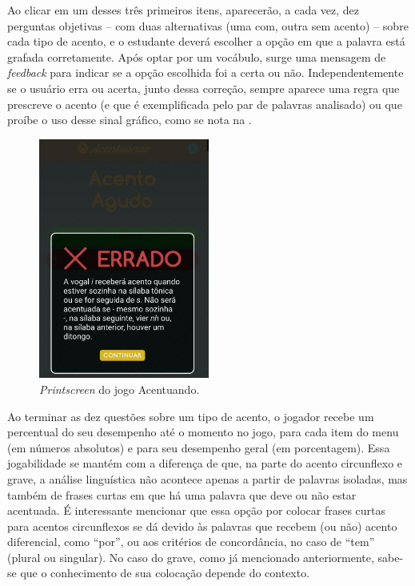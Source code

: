 \documentclass{textolivre}
\begin{document}
Ao clicar em um desses três primeiros itens, aparecerão, a cada vez, dez perguntas objetivas – com duas alternativas (uma com, outra sem acento) – sobre cada tipo de acento, e o estudante deverá escolher a opção em que a palavra está grafada corretamente. Após optar por um vocábulo, surge uma mensagem de \emph{feedback} para indicar se a opção escolhida foi a certa ou não. Independentemente se o usuário erra ou acerta, junto dessa correção, sempre aparece uma regra que prescreve o acento (e que é exemplificada pelo par de palavras analisado) ou que proíbe o uso desse sinal gráfico, como se nota na .

\begin{figure}[htbp]
 \centering
 \includegraphics[width=0.5\textwidth]{fig4.png}
 \caption{\emph{Printscreen} do jogo Acentuando.}
 \label{fig4}
\end{figure}

Ao terminar as dez questões sobre um tipo de acento, o jogador recebe um percentual do seu desempenho até o momento no jogo, para cada item do menu (em números absolutos) e para seu desempenho geral (em porcentagem). Essa jogabilidade se mantém com a diferença de que, na parte do acento circunflexo e grave, a análise linguística não acontece apenas a partir de palavras isoladas, mas também de frases curtas em que há uma palavra que deve ou não estar acentuada. É interessante mencionar que essa opção por colocar frases curtas para acentos circunflexos se dá devido às palavras que recebem (ou não) acento diferencial, como “por”, ou aos critérios de concordância, no caso de “tem” (plural ou singular). No caso do grave, como já mencionado anteriormente, sabe-se que o conhecimento de sua colocação depende do contexto.
\end{document}
